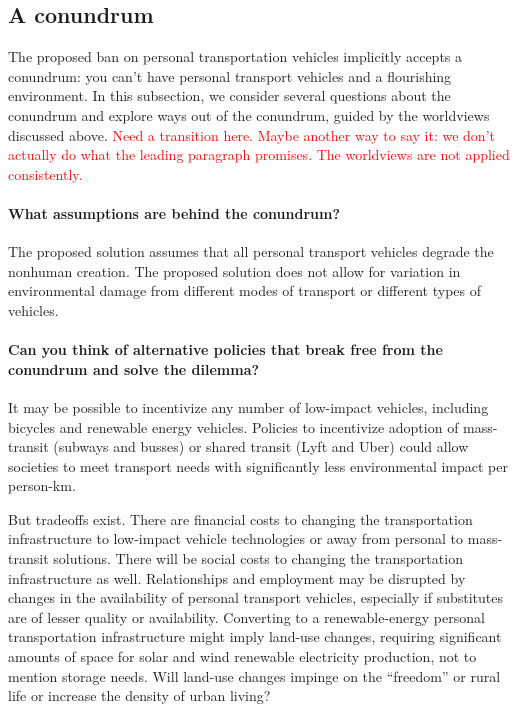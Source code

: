 \documentclass[12pt]{article}
\newcommand{\ins}[1]{\textcolor{red}{#1}}
\begin{document}
\subsection{A conundrum}
\label{sec:conundrum}

The proposed ban on personal transportation vehicles
implicitly accepts a conundrum: 
you can't have personal transport vehicles and a flourishing environment. 
In this subsection, we consider several questions about the conundrum and 
explore ways out of the conundrum,
guided by the worldviews discussed above.
\ins{Need a transition here.
Maybe another way to say it:
we don't actually do what the leading paragraph promises.
The worldviews are not applied consistently.}

\paragraph{What assumptions are behind the conundrum?} 

The proposed solution assumes that all personal transport vehicles degrade the nonhuman creation. 
The proposed solution does not allow for variation in environmental damage
from different modes of transport or different types of vehicles.

\paragraph{Can you think of alternative policies that break free from the conundrum and solve the dilemma?} 

It may be possible to incentivize any number of low-impact vehicles, including 
bicycles and renewable energy vehicles.
Policies to incentivize adoption of 
mass-transit (subways and busses) or shared transit (Lyft and Uber)
could allow societies to meet transport needs with significantly less environmental impact 
per person-km.

But tradeoffs exist. 
There are financial costs to changing the transportation infrastructure to low-impact vehicle technologies
or away from personal to mass-transit solutions. 
There will be social costs to changing the transportation infrastructure as well.
Relationships and employment may be disrupted by changes in the availability of personal transport vehicles,
especially if substitutes are of lesser quality or availability.
Converting to a renewable-energy personal transportation infrastructure 
might imply land-use changes, 
requiring significant amounts of space for solar and wind renewable electricity production,
not to mention storage needs. 
Will land-use changes impinge on the ``freedom'' or rural life 
or increase the density of urban living?
\end{document}
